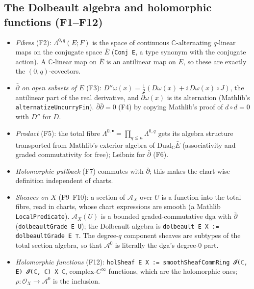 \subsection{The Dolbeault algebra and holomorphic functions (F1--F12)}
\begin{itemize}
\item \emph{Fibres} (F2): $\Lambda^{0,q}(E;F)$ is the space of continuous $\mathbb C$-alternating
$q$-linear maps on the conjugate space $\bar E$ (\texttt{Conj E}, a type synonym with the conjugate
action). A $\mathbb C$-linear map on $\bar E$ is an antilinear map on $E$, so these are exactly
the $(0,q)$-covectors.
\item \emph{${\bar\partial}$ on open subsets of $E$} (F3): $D''\omega(x)=\tfrac12(D\omega(x)+i\,D\omega(x)\circ J)$,
the antilinear part of the real derivative, and ${\bar\partial}\omega(x)$ is its alternation (Mathlib's
\texttt{alternatizeUncurryFin}). ${\bar\partial}{\bar\partial}=0$ (F4) by copying Mathlib's proof of $d\circ d=0$
with $D''$ for $D$.
\item \emph{Product} (F5): the total fibre $\Lambda^{0,\bullet}=\prod_{q\le n}\Lambda^{0,q}$ gets
its algebra structure transported from Mathlib's exterior algebra of $\mathrm{Dual}_{\mathbb C}\bar
E$ (associativity and graded commutativity for free); Leibniz for ${\bar\partial}$ (F6).
\item \emph{Holomorphic pullback} (F7) commutes with ${\bar\partial}$; this makes the chart-wise definition
independent of charts.
\item \emph{Sheaves on $X$} (F9--F10): a section of ${\mathcal{A}}_X$ over $U$ is a function into the total
fibre, read in charts, whose chart expressions are smooth (a Mathlib \texttt{LocalPredicate}).
${\mathcal{A}}_X(U)$ is a bounded graded-commutative dga with ${\bar\partial}$ (\texttt{dolbeaultGrade E U}); the
Dolbeault algebra is \texttt{dolbeault E X := dolbeaultGrade E ⊤}. The degree-$q$ component sheaves
are subtypes of the total section algebra, so that ${\mathcal{A}}^0$ is literally the dga's degree-0 part.
\item \emph{Holomorphic functions} (F12): \texttt{holSheaf E X := smoothSheafCommRing 𝓘(ℂ, E) 𝓘(ℂ, ℂ) X ℂ},
complex-$C^\infty$ functions, which are the holomorphic ones; $\rho\colon{\mathcal{O}}_X\to{\mathcal{A}}^0$ is the
inclusion.
\end{itemize}

